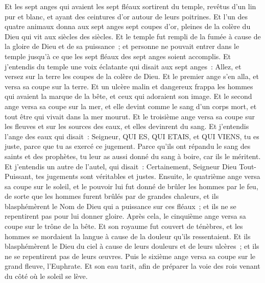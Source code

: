 \begin{multicols}{2}
Et les sept anges qui avaient les sept fléaux sortirent du temple, revêtus d'un lin pur et blanc, et ayant des ceintures d'or autour de leurs poitrines.
Et l'un des quatre animaux donna aux sept anges sept coupes d'or, pleines de la colère du Dieu qui vit aux siècles des siècles.
Et le temple fut rempli de la fumée à cause de la gloire de Dieu et de sa puissance~; et personne ne pouvait entrer dans le temple jusqu'à ce que les sept fléaux des sept anges soient accomplis.
\VerseOne{}Et j'entendis du temple une voix éclatante qui disait aux sept anges~: Allez, et versez sur la terre les coupes de la colère de Dieu.
Et le premier ange s'en alla, et versa sa coupe sur la terre. Et un ulcère malin et dangereux frappa les hommes qui avaient la marque de la bête, et ceux qui adoraient son image.
Et le second ange versa sa coupe sur la mer, et elle devint comme le sang d'un corps mort, et tout être qui vivait dans la mer mourut.
Et le troisième ange versa sa coupe sur les fleuves et sur les sources des eaux, et elles devinrent du sang.
Et j'entendis l'ange des eaux qui disait~: Seigneur, QUI ES, QUI ETAIS, et QUI VIENS, tu es juste, parce que tu as exercé ce jugement.
Parce qu'ils ont répandu le sang des saints et des prophètes, tu leur as aussi donné du sang à boire, car ils le méritent.
Et j'entendis un autre de l'autel, qui disait~: Certainement, Seigneur Dieu Tout-Puissant, tes jugements sont véritables et justes.
Ensuite, le quatrième ange versa sa coupe sur le soleil, et le pouvoir lui fut donné de brûler les hommes par le feu,
de sorte que les hommes furent brûlés par de grandes chaleurs, et ils blasphémèrent le Nom de Dieu qui a puissance sur ces fléaux~; et ils ne se repentirent pas pour lui donner gloire.
Après cela, le cinquième ange versa sa coupe sur le trône de la bête. Et son royaume fut couvert de ténèbres, et les hommes se mordaient la langue à cause de la douleur qu'ils ressentaient.
Et ils blasphémèrent le Dieu du ciel à cause de leurs douleurs et de leurs ulcères~; et ils ne se repentirent pas de leurs œuvres.
Puis le sixième ange versa sa coupe sur le grand fleuve, l'Euphrate. Et son eau tarit, afin de préparer la voie des rois venant du côté où le soleil se lève.

\end{multicols}
